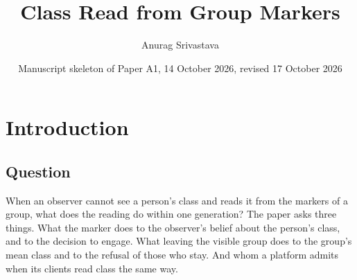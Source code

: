 \newcommand{\krow}[4]{#1 & #2 & \rowref{#3} & #4 \\ \addlinespace}
\newcommand{\prow}[6]{#1 & #2 & #3 & #4 & #5 & \rowref{#6} \\ \addlinespace}
\newcommand{\arow}[6]{#1 & #2 & #3 & #4 & \rowref{#5} & #6 \\ \addlinespace}
\newcommand{\mrow}[4]{#1 & #2 & #3 & \lean{#4} & p.~\pageref{proof:#1} \\ \addlinespace}
\newcommand{\lrow}[6]{#1 & \citet{#2} & #3 & ``#4'' & #5 & \rowref{#6} \\ \addlinespace}
\newcommand{\crow}[3]{#1 & #2 & \rowref{#3} \\ \addlinespace}

\newenvironment{mproof}[2]
  {\subsection*{Proof of #1}\label{proof:#1}%
   {\raggedright\noindent\textit{Lean:} \lean{#2}.\par}\smallskip}
  {\par\hfill$\square$\par\medskip}

\title{Class Read from Group Markers}
\author{Anurag Srivastava}
\date{Manuscript skeleton of Paper A1, 14 October 2026, revised 17 October 2026}


\maketitle

\section{Introduction}

\subsection{Question}

When an observer cannot see a person's class and reads it from the markers
of a group, what does the reading do within one generation? The paper asks
three things. What the marker does to the observer's belief about the
person's class, and to the decision to engage. What leaving the visible group does to the group's mean
class and to the refusal of those who stay. And whom a platform admits when
its clients read class the same way.


